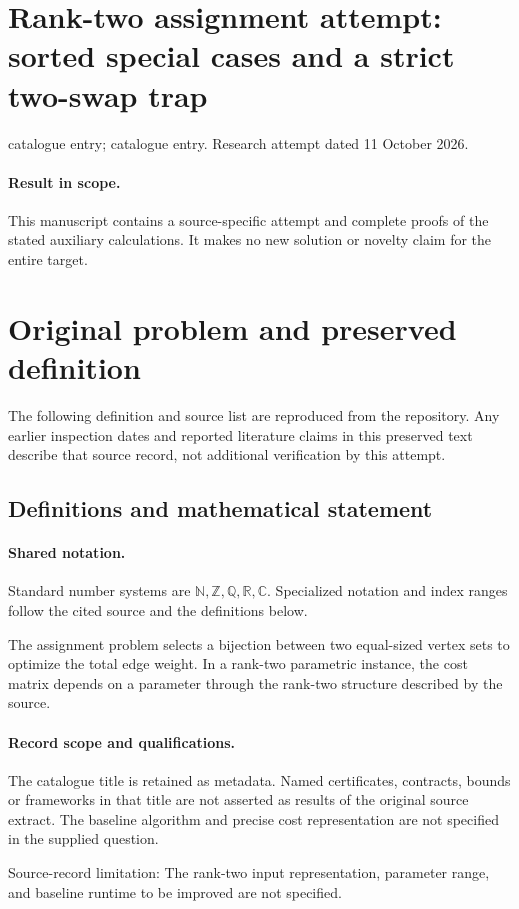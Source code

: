 \documentclass[11pt]{article}
\begin{document}
\section*{Rank-two assignment attempt: sorted special cases and a strict two-swap trap}
\noindent catalogue entry; catalogue entry. Research attempt dated 11 October 2026.
\paragraph{Result in scope.}This manuscript contains a source-specific attempt and complete proofs of the stated auxiliary calculations. It makes no new solution or novelty claim for the entire target.
\section{Original problem and preserved definition}
The following definition and source list are reproduced from the repository. Any earlier inspection dates and reported literature claims in this preserved text describe that source record, not additional verification by this attempt.
\subsection{Definitions and mathematical statement}

\paragraph{Shared notation.}Standard number systems are $\mathbb N,\mathbb Z,\mathbb Q,\mathbb R,\mathbb C$. Specialized notation and index ranges follow the cited source and the definitions below.


The assignment problem selects a bijection between two equal-sized vertex sets to optimize the total edge weight. In a rank-two parametric instance, the cost matrix depends on a parameter through the rank-two structure described by the source.
\paragraph{Record scope and qualifications.}
The catalogue title is retained as metadata. Named certificates, contracts, bounds or frameworks in that title are not asserted as results of the original source extract.
The baseline algorithm and precise cost representation are not specified in the supplied question.

Source-record limitation: The rank-two input representation, parameter range, and baseline runtime to be improved are not specified.
\end{document}
